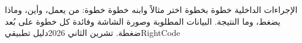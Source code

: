 \documentclass{report}
\begin{document}
{الإجراءات الداخلية خطوة بخطوة}
{اختر مثالاً وابنه خطوة خطوة: من يعمل، وأين، وماذا يضغط، وما النتيجة. البيانات المطلوبة وصورة الشاشة وفائدة كل خطوة على بُعد ضغطة.}
{تشرين الثاني 2026}{دليل تطبيقي}{RightCode}


\end{document}
